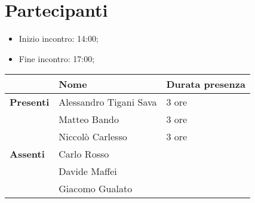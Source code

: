 \section{Partecipanti}

\begin{itemize}
    \item Inizio incontro: 14:00;
    \item Fine incontro: 17:00;
\end{itemize}


\begin{center}
{\renewcommand{\arraystretch}{1.5}
\begin{tabular}{lll}
	                    & \textbf{Nome}  & \textbf{Durata presenza} 	\\
	\hline
	\textbf{Presenti}   & Alessandro Tigani Sava	& 3 ore     \\
						& Matteo Bando				& 3 ore		\\
						& Niccolò Carlesso			& 3 ore		\\
	\hline
	\textbf{Assenti}	& Carlo Rosso				&			\\
						& Davide Maffei             &	        \\
						& Giacomo Gualato			&			\\
\end{tabular}	
}
\end{center}